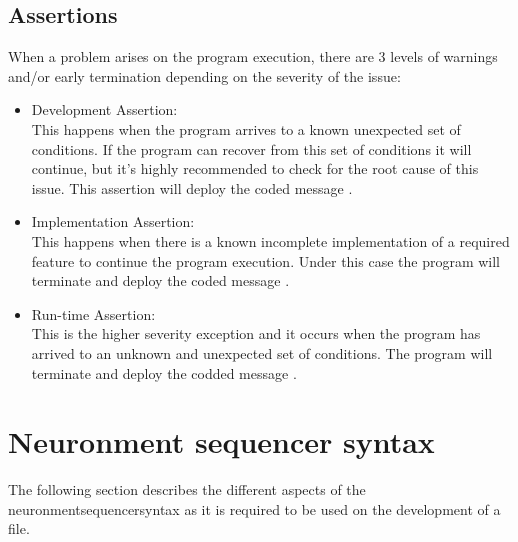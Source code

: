 \subsection{Assertions}

When a problem arises on the program execution, there are 3 levels of warnings and/or early termination depending on the severity of the issue:
\begin{itemize}
  \item Development Assertion:\\
  This happens when the program arrives to a known unexpected set of conditions. If the program can recover from this set of conditions it will continue, but it's highly recommended to check for the root cause of this issue. This assertion will deploy the coded message .
  \item Implementation Assertion:\\
  This happens when there is a known incomplete implementation of a required feature to continue the program execution. Under this case the program will terminate and deploy the coded message .
  \item Run-time Assertion:\\
  This is the higher severity exception and it occurs when the program has arrived to an unknown and unexpected set of conditions. The program will terminate and deploy the codded message .
\end{itemize}

\section{Neuronment sequencer syntax}

The following section describes the different aspects of the \gls{neuronmentsequencersyntax} as it is required to be used on the development of a \NPROC file.

